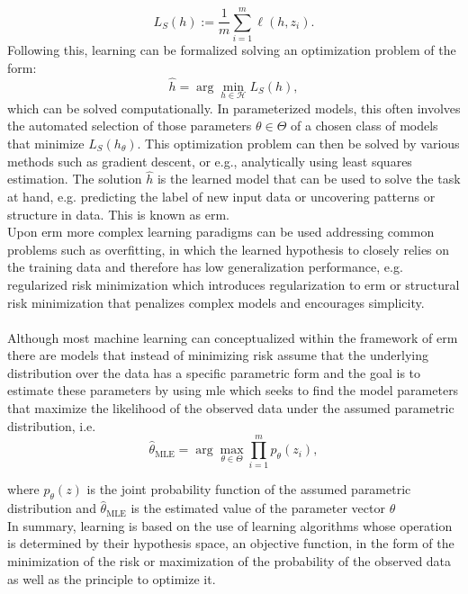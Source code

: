 \begin{equation}
L_{S}(h):=\frac{1}{m}\sum_{i=1}^m\ell(h,z_i).
\end{equation}
Following this, learning can be formalized solving an optimization problem of the form: 
\begin{equation}
\hat{h}=\arg\min_{h\in\mathcal{H}}L_{S}(h),
\end{equation}
which can be solved computationally. In parameterized models, this often involves the automated selection of those parameters $\theta\in\Theta$  of a chosen class of models that minimize $L_{S}(h_\theta)$. This optimization problem can then be solved by various methods such as gradient descent,  or e.g., analytically using least squares estimation. The solution $\hat{h}$ is the learned model that can be used to solve the task at hand, e.g. predicting the label of new input data or uncovering patterns or structure in data. This is known as \gls{erm}.\\
Upon \gls{erm} more complex learning paradigms can be used addressing common problems such as overfitting, in which the learned hypothesis to closely relies on the training data and therefore has low generalization performance, e.g. regularized risk minimization which introduces regularization to \gls{erm} or structural risk minimization that penalizes complex models and encourages simplicity.\\
\\
Although most machine learning can conceptualized within the framework of \gls{erm} there are models that instead of minimizing risk assume that the underlying distribution over the data has a specific parametric form and the goal is to estimate these parameters by using \gls{mle} 
which seeks to find the model parameters that maximize the likelihood of the observed data under the assumed parametric distribution, i.e. \\
\begin{equation}
\hat{\theta}_{\text{MLE}} = \arg\max_{\theta\in\Theta}\prod_{i=1}^{m}p_{\theta}(z_i),
\end{equation}

where $p_{\theta}(z)$ is the joint probability function of the assumed parametric distribution and $\hat{\theta}_{\text{MLE}}$ is the estimated value of the parameter vector $\theta$
\\
In summary, learning is based on the use of learning algorithms whose operation is determined by their hypothesis space, an objective function, in the form of the minimization of the risk or maximization of the probability of the observed data as well as the principle to optimize it.

